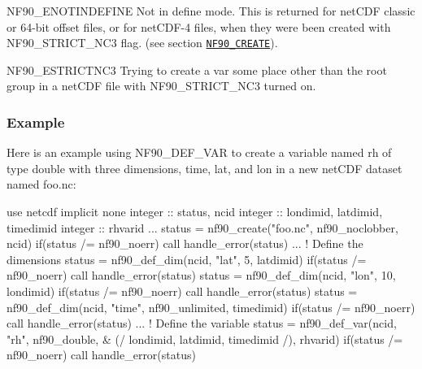 \begin{DoxyItemize}
\item N\+F90\+\_\+\+E\+N\+O\+T\+I\+N\+D\+E\+F\+I\+NE Not in define mode. This is returned for net\+C\+DF classic or 64-\/bit offset files, or for net\+C\+D\+F-\/4 files, when they were been created with N\+F90\+\_\+\+S\+T\+R\+I\+C\+T\+\_\+\+N\+C3 flag. (see section \href{#NF90_005fCREATE}{\tt N\+F90\+\_\+\+C\+R\+E\+A\+TE}).
\item N\+F90\+\_\+\+E\+S\+T\+R\+I\+C\+T\+N\+C3 Trying to create a var some place other than the root group in a net\+C\+DF file with N\+F90\+\_\+\+S\+T\+R\+I\+C\+T\+\_\+\+N\+C3 turned on.
\end{DoxyItemize}

\subsubsection*{Example}

Here is an example using N\+F90\+\_\+\+D\+E\+F\+\_\+\+V\+AR to create a variable named rh of type double with three dimensions, time, lat, and lon in a new net\+C\+DF dataset named foo.\+nc\+:


\begin{DoxyCode}
\textcolor{keywordtype}{use }netcdf
\textcolor{keywordtype}{implicit none}
\textcolor{keywordtype}{integer} :: status, ncid
\textcolor{keywordtype}{integer} :: londimid, latdimid, timedimid
\textcolor{keywordtype}{integer} :: rhvarid
...
status = nf90\_create(\textcolor{stringliteral}{"foo.nc"}, nf90\_noclobber, ncid)
\textcolor{keywordflow}{if}(status /= nf90\_noerr) \textcolor{keyword}{call }handle\_error(status)
...
\textcolor{comment}{! Define the dimensions}
status = nf90\_def\_dim(ncid, \textcolor{stringliteral}{"lat"}, 5, latdimid)
\textcolor{keywordflow}{if}(status /= nf90\_noerr) \textcolor{keyword}{call }handle\_error(status)
status = nf90\_def\_dim(ncid, \textcolor{stringliteral}{"lon"}, 10, londimid)
\textcolor{keywordflow}{if}(status /= nf90\_noerr) \textcolor{keyword}{call }handle\_error(status)
status = nf90\_def\_dim(ncid, \textcolor{stringliteral}{"time"}, nf90\_unlimited, timedimid)
\textcolor{keywordflow}{if}(status /= nf90\_noerr) \textcolor{keyword}{call }handle\_error(status)
...
\textcolor{comment}{! Define the variable}
status = nf90\_def\_var(ncid, \textcolor{stringliteral}{"rh"}, nf90\_double, &
                      (/ londimid, latdimid, timedimid /), rhvarid)
\textcolor{keywordflow}{if}(status /= nf90\_noerr) \textcolor{keyword}{call }handle\_error(status)
\end{DoxyCode}


